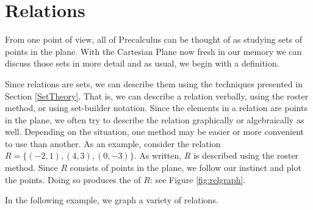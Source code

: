 \section{Relations}
\label{Relations}

From one point of view, all of Precalculus can be thought of as studying sets of points in the plane.  With the Cartesian Plane now fresh in our memory we can discuss those sets in more detail and as usual, we begin with a definition.

\smallskip




\smallskip

Since relations are sets, we can describe them using the techniques presented in Section \ref{SetTheory}.  That is, we can describe a relation verbally, using the roster method, or using set-builder notation. Since the elements in a relation are points in the plane, we often try to describe the relation graphically or algebraically as well.  Depending on the situation, one method may be easier or more convenient to use than another.  As an example, consider the relation $R = \{ (-2,1),(4,3), (0,-3) \}$.  As written, $R$ is described using the roster method.  Since $R$ consists of points in the plane, we follow our instinct and plot the points.  Doing so produces the    of $R$: see Figure \ref{fig:relgraph}.


In the following example, we graph a variety of relations.


\medskip

